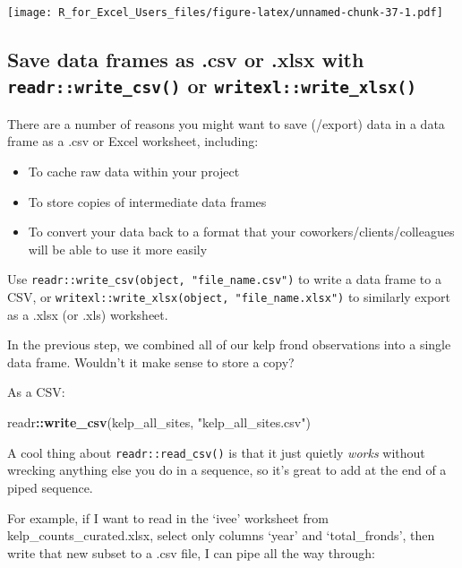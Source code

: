 \documentclass[]{book}
\newenvironment{Shaded}{\begin{snugshade}}{\end{snugshade}}
\newcommand{\KeywordTok}[1]{\textcolor[rgb]{0.13,0.29,0.53}{\textbf{#1}}}
\newcommand{\NormalTok}[1]{#1}
\newcommand{\OperatorTok}[1]{\textcolor[rgb]{0.81,0.36,0.00}{\textbf{#1}}}
\newcommand{\StringTok}[1]{\textcolor[rgb]{0.31,0.60,0.02}{#1}}
\providecommand{\tightlist}{%
  \setlength{\itemsep}{0pt}\setlength{\parskip}{0pt}}
\begin{document}
\texttt{[image: R\_for\_Excel\_Users\_files/figure-latex/unnamed-chunk-37-1.pdf]}

\hypertarget{save-data-frames-as-.csv-or-.xlsx-with-readrwrite_csv-or-writexlwrite_xlsx}{%
\subsection{\texorpdfstring{Save data frames as .csv or .xlsx with \texttt{readr::write\_csv()} or \texttt{writexl::write\_xlsx()}}{Save data frames as .csv or .xlsx with readr::write\_csv() or writexl::write\_xlsx()}}\label{save-data-frames-as-.csv-or-.xlsx-with-readrwrite_csv-or-writexlwrite_xlsx}}

There are a number of reasons you might want to save (/export) data in a data frame as a .csv or Excel worksheet, including:

\begin{itemize}
\tightlist
\item
  To cache raw data within your project
\item
  To store copies of intermediate data frames
\item
  To convert your data back to a format that your coworkers/clients/colleagues will be able to use it more easily
\end{itemize}

Use \texttt{readr::write\_csv(object,\ "file\_name.csv")} to write a data frame to a CSV, or \texttt{writexl::write\_xlsx(object,\ "file\_name.xlsx")} to similarly export as a .xlsx (or .xls) worksheet.

In the previous step, we combined all of our kelp frond observations into a single data frame. Wouldn't it make sense to store a copy?

As a CSV:

\begin{Shaded}
\begin{Highlighting}[]
\NormalTok{readr}\OperatorTok{::}\KeywordTok{write_csv}\NormalTok{(kelp_all_sites, }\StringTok{"kelp_all_sites.csv"}\NormalTok{)}
\end{Highlighting}
\end{Shaded}

A cool thing about \texttt{readr::read\_csv()} is that it just quietly \emph{works} without wrecking anything else you do in a sequence, so it's great to add at the end of a piped sequence.

For example, if I want to read in the `ivee' worksheet from kelp\_counts\_curated.xlsx, select only columns `year' and `total\_fronds', then write that new subset to a .csv file, I can pipe all the way through:
\end{document}
